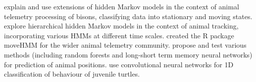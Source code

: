\citeauthor{langrock2012flexible} explain and use extensions of hidden Markov models in the context of animal telemetry processing of bisons, classifying data into stationary and moving states. \citeauthor{leos2017multi} explore hierarchical hidden Markov models in the context of animal tracking, incorporating various HMMs at different time scales. \citeauthor{michelot2016movehmm} created the R package moveHMM for the wider animal telemetry community. \citeauthor{wijeyakulasuriya2020machine} propose and test various methods (including random forests and long-short term memory neural networks) for prediction of animal positions. \citeauthor{jeantet2021fully} use convolutional neural networks for 1D classification of behaviour of juvenile turtles.




